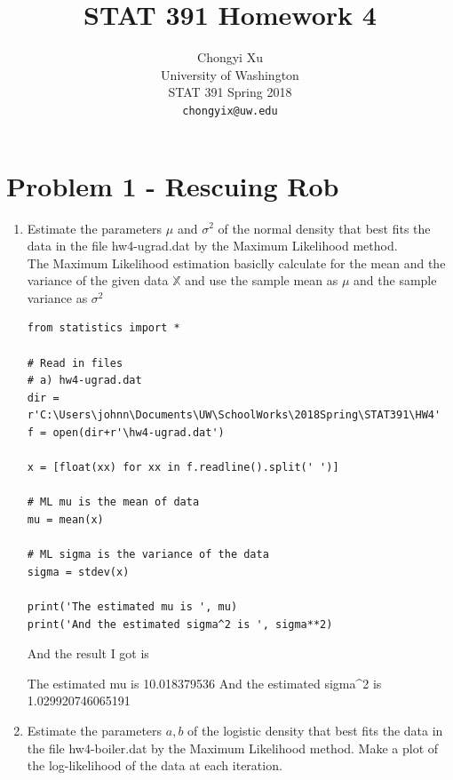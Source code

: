 \documentclass[preprint,12pt]{elsarticle}
\begin{document}
    \title{\LARGE \bf
        STAT 391 Homework 4
        }
        
        \author{ \parbox{3 in}{\centering Chongyi Xu \\
                 University of Washington\\
                 STAT 391 Spring 2018\\
                 {\tt\small chongyix@uw.edu}}
        }
    \maketitle

    \section{Problem 1 - Rescuing Rob}
    \begin{enumerate}[label=\alph*]
        \item Estimate the parameters $\mu$ and $\sigma^2$ of the 
        normal density that best fits the data in the file hw4-ugrad.dat
        by the Maximum Likelihood method.\\

        The Maximum Likelihood estimation basiclly calculate for 
        the mean and the variance of the given data $\mathbb{X}$ and 
        use the sample mean as $\mu$ and the sample variance as $\sigma^2$

        \begin{lstlisting}
from statistics import *

# Read in files
# a) hw4-ugrad.dat
dir = r'C:\Users\johnn\Documents\UW\SchoolWorks\2018Spring\STAT391\HW4'
f = open(dir+r'\hw4-ugrad.dat')

x = [float(xx) for xx in f.readline().split(' ')]

# ML mu is the mean of data
mu = mean(x)

# ML sigma is the variance of the data
sigma = stdev(x)

print('The estimated mu is ', mu)
print('And the estimated sigma^2 is ', sigma**2)
        \end{lstlisting}

        And the result I got is 
        \begin{spverbatim}
The estimated mu is  10.018379536
And the estimated sigma^2 is  1.029920746065191
        \end{spverbatim}

        \item Estimate the parameters $a,b$ of the logistic density
        that best fits the data in the file hw4-boiler.dat by the
        Maximum Likelihood method. Make a plot of the log-likelihood
        of the data at each iteration.\\


\end{enumerate}
\end{document}
